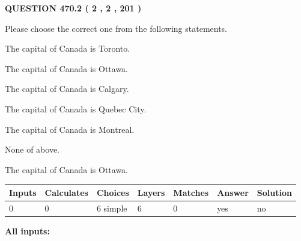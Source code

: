 \documentclass[12pt]{article}
\begin{document}
   
  
\vspace{0.2in}
  
{\textbf{\Large{QUESTION
470.2 
 ( 2 , 2 , 201 )
}}}
  
  
Please choose the correct one from the following statements.
 
 
The capital of Canada is Toronto.
 
 
The capital of Canada is Ottawa.
 
 
The capital of Canada is Calgary.
 
 
The capital of Canada is Quebec City.
 
 
The capital of Canada is Montreal.
 
 
 None of above.
 
 
\noindent{}
 
 
The capital of Canada is Ottawa.
 
 
\noindent{}
 
 
   
   
   
   
\noindent\begin{tabular}{|l|l|l|l|l|l|l|}
 \hline
Inputs & Calculates & Choices & Layers & Matches & Answer & Solution \\ \hline
 0  & 
 0  & 
 6
  simple  
  & 
 6  & 
 0  & 
  yes & 
  no 
  \\ \hline
 \end{tabular}
   
   
   
   
\noindent{}
   
   
   
   
\noindent\vspace{0.1in}\hspace{-0.08in} {\textbf{\Large{All inputs: }}}
   
   
   
   
   
   
 \vspace{0.2in}
 
   
   
\end{document}
